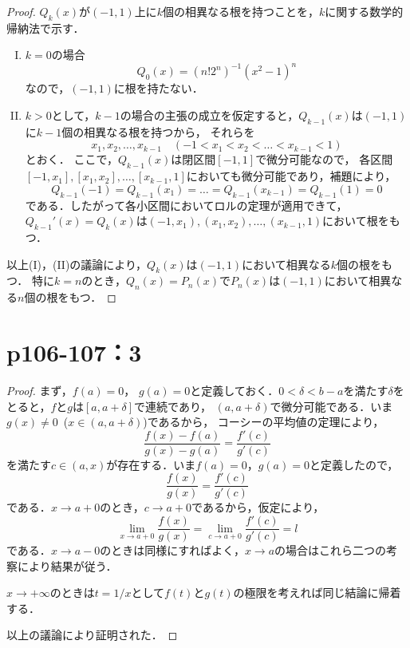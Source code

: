 \documentclass[a4paper,10pt,fleqn]{ltjsarticle}
\begin{document}
\begin{leftbar}
    \begin{proof}
        $Q_k (x)$が$(-1,1)$上に$k$個の相異なる根を持つことを，$k$に関する数学的帰納法で示す．
        \begin{enumerate}[(I)]
        \item $k=0$の場合
        \[
            Q_0(x)= (n! 2^n)^{-1} (x^2-1)^n
        \]
        なので，$(-1,1)$に根を持たない．
        \item $k>0$として，$k-1$の場合の主張の成立を仮定すると，$Q_{k-1}(x)$は$(-1,1)$に$k-1$個の相異なる根を持つから，
        それらを
        \[
        x_1,x_2,\dots,x_{k-1}\quad (-1<x_1<x_2<\dots <x_{k-1}<1)
        \]とおく．
        ここで，$Q_{k-1} (x)$は閉区間$[-1,1]$で微分可能なので，
        各区間$[-1,x_1],[x_1,x_2],\dots,[x_{k-1},1]$においても微分可能であり，補題により，
        \[
            Q_{k-1} (-1) = Q_{k-1}(x_1)=\dots = Q_{k-1}(x_{k-1})=Q_{k-1}(1)=0
        \]
        である．したがって各小区間においてロルの定理が適用できて，$Q_{k-1}' (x)=Q_k(x)$は$(-1,x_1),(x_1,x_2),\dots,(x_{k-1},1)$において根をもつ．
        \end{enumerate}
        以上(I)，(II)の議論により，$Q_k (x)$は$(-1,1)$において相異なる$k$個の根をもつ．
        特に$k=n$のとき，$Q_n (x)=P_n(x)$で$P_n (x)$は$(-1,1)$において相異なる$n$個の根をもつ．
    \end{proof}
\end{leftbar}

\newpage 

\section*{p106-107：3}

\begin{tleftbar}
  \begin{proof}
  まず，$f(a)=0$， $g(a)=0$と定義しておく．$0<\delta <b-a$を満たす$\delta$をとると，$f$と$g$は$[a,a+\delta]$で連続であり，
  $(a,a+\delta)$で微分可能である．いま$g(x) \ne 0$~($ x \in (a,a+\delta)$)であるから，
  コーシーの平均値の定理により，
  \[
    \frac{f(x)-f(a)}{g(x)-g(a)} = \frac{f'(c)}{g'(c)}
  \]
  を満たす$c \in (a,x)$が存在する．いま$f(a)=0$，$g(a)=0$と定義したので，
  \[
    \frac{f(x)}{g(x)} = \frac{f'(c)}{g'(c)}
  \]
  である．$ x \to a+0$のとき，$c \to a+0$であるから，仮定により，
  \[
    \lim_{x \to a+0} \frac{f(x)}{g(x)} = \lim_{c \to a+0} \frac{f'(c)}{g'(c)} =l 
  \]
  である．$ x \to a-0$のときは同様にすればよく，$ x \to a$の場合はこれら二つの考察により結果が従う．

  $ x \to +\infty$のときは$ t=1/x$として$f(t)$と$g(t)$の極限を考えれば同じ結論に帰着する．

  以上の議論により証明された．
  \end{proof}
\end{tleftbar}
\end{document}
